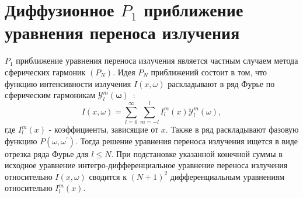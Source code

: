 \section{Диффузионное $P_{1}$ приближение уравнения переноса излучения}
\label{sec:ch1/sec2}

$P_{1}$ приближение уравнения переноса излучения является частным случаем метода
сферических гармоник $\left(P_{N}\right)$.
Идея $P_{N}$ приближений состоит в том,
что функцию интенсивности излучения $I(x, \omega)$
раскладывают в ряд Фурье по сферическим гармоникам
$\mathcal{Y}_{l}^{m}(\boldsymbol{\omega})$~\cite[496]{modest2013radiative}:
\[
    I(x, \omega)=\sum_{l=0}^{\infty} \sum_{m=-l}^{l} I_{l}^{m}(x)
    \mathcal{Y}_{l}^{m}(\omega),
\]
где $I_{l}^{m}(x)$ - коэффициенты, зависящие от $x$.
Также в ряд раскладывают фазовую функцию $P\left(\omega, \omega^{\prime}\right)$.
Тогда решение уравнения переноса излучения ищется в виде отрезка ряда Фурье для $l \leqslant N$.
При подстановке указанной конечной суммы в исходное
уравнение интегро-дифференциальное уравнение
переноса излучения относительно $I(x, \omega)$ сводится
к $(N+1)^{2}$ дифференциальным уравнениям
относительно $I_{l}^{m}(x)$.


